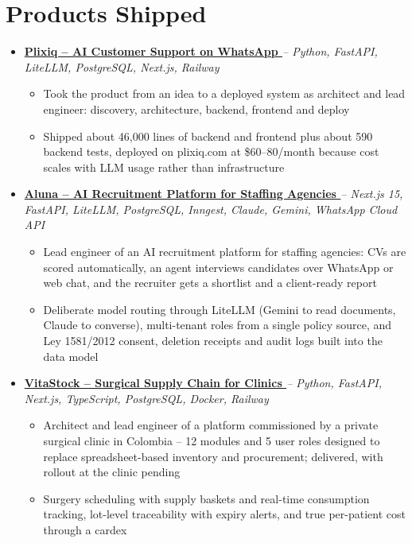 \documentclass[letterpaper,10pt]{article}
\newcommand{\normalfaExternalLink}{{\mdseries\faExternalLink}}
\begin{document}
\section{Products Shipped}
\begin{itemize}[leftmargin=*, itemsep=2pt]
    \item \textbf{\href{https://plixiq.com}{Plixiq -- AI Customer Support on WhatsApp \normalfaExternalLink}} \textit{-- Python, FastAPI, LiteLLM, PostgreSQL, Next.js, Railway}
    \begin{itemize}[itemsep=0pt]
        \item Took the product from an idea to a deployed system as architect and lead engineer: discovery, architecture, backend, frontend and deploy
        \item Shipped about 46,000 lines of backend and frontend plus about 590 backend tests, deployed on plixiq.com at \$60--80/month because cost scales with LLM usage rather than infrastructure
    \end{itemize}
    \item \textbf{\href{https://www.aluna.works}{Aluna -- AI Recruitment Platform for Staffing Agencies \normalfaExternalLink}} \textit{-- Next.js 15, FastAPI, LiteLLM, PostgreSQL, Inngest, Claude, Gemini, WhatsApp Cloud API}
    \begin{itemize}[itemsep=0pt]
        \item Lead engineer of an AI recruitment platform for staffing agencies: CVs are scored automatically, an agent interviews candidates over WhatsApp or web chat, and the recruiter gets a shortlist and a client-ready report
        \item Deliberate model routing through LiteLLM (Gemini to read documents, Claude to converse), multi-tenant roles from a single policy source, and Ley 1581/2012 consent, deletion receipts and audit logs built into the data model
    \end{itemize}
    \item \textbf{\href{https://vitastock.piagents.dev}{VitaStock -- Surgical Supply Chain for Clinics \normalfaExternalLink}} \textit{-- Python, FastAPI, Next.js, TypeScript, PostgreSQL, Docker, Railway}
    \begin{itemize}[itemsep=0pt]
        \item Architect and lead engineer of a platform commissioned by a private surgical clinic in Colombia -- 12 modules and 5 user roles designed to replace spreadsheet-based inventory and procurement; delivered, with rollout at the clinic pending
        \item Surgery scheduling with supply baskets and real-time consumption tracking, lot-level traceability with expiry alerts, and true per-patient cost through a cardex
    \end{itemize}
\end{itemize}
\end{document}
